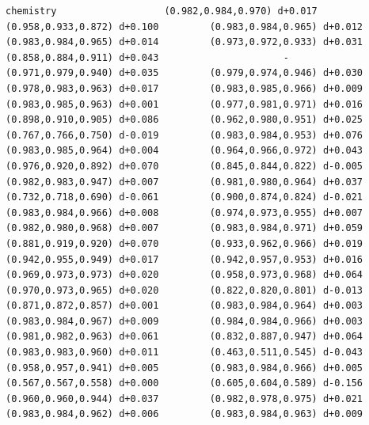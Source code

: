 \documentclass[11pt, letterpaper, openany]{book}
\begin{document}
\begin{empiricalbox}
\begin{lstlisting}[style=terminal]
chemistry                   (0.982,0.984,0.970) d+0.017         (0.958,0.933,0.872) d+0.100         (0.983,0.984,0.965) d+0.012         (0.983,0.984,0.965) d+0.014         (0.973,0.972,0.933) d+0.031         (0.858,0.884,0.911) d+0.043                      -                      (0.971,0.979,0.940) d+0.035         (0.979,0.974,0.946) d+0.030         (0.978,0.983,0.963) d+0.017         (0.983,0.985,0.966) d+0.009         (0.983,0.985,0.963) d+0.001         (0.977,0.981,0.971) d+0.016         (0.898,0.910,0.905) d+0.086         (0.962,0.980,0.951) d+0.025         (0.767,0.766,0.750) d-0.019         (0.983,0.984,0.953) d+0.076         (0.983,0.985,0.964) d+0.004         (0.964,0.966,0.972) d+0.043         (0.976,0.920,0.892) d+0.070         (0.845,0.844,0.822) d-0.005         (0.982,0.983,0.947) d+0.007         (0.981,0.980,0.964) d+0.037         (0.732,0.718,0.690) d-0.061         (0.900,0.874,0.824) d-0.021         (0.983,0.984,0.966) d+0.008         (0.974,0.973,0.955) d+0.007         (0.982,0.980,0.968) d+0.007         (0.983,0.984,0.971) d+0.059         (0.881,0.919,0.920) d+0.070         (0.933,0.962,0.966) d+0.019         (0.942,0.955,0.949) d+0.017         (0.942,0.957,0.953) d+0.016         (0.969,0.973,0.973) d+0.020         (0.958,0.973,0.968) d+0.064         (0.970,0.973,0.965) d+0.020         (0.822,0.820,0.801) d-0.013         (0.871,0.872,0.857) d+0.001         (0.983,0.984,0.964) d+0.003         (0.983,0.984,0.967) d+0.009         (0.984,0.984,0.966) d+0.003         (0.981,0.982,0.963) d+0.061         (0.832,0.887,0.947) d+0.064         (0.983,0.983,0.960) d+0.011         (0.463,0.511,0.545) d-0.043         (0.958,0.957,0.941) d+0.005         (0.983,0.984,0.966) d+0.005         (0.567,0.567,0.558) d+0.000         (0.605,0.604,0.589) d-0.156         (0.960,0.960,0.944) d+0.037         (0.982,0.978,0.975) d+0.021         (0.983,0.984,0.962) d+0.006         (0.983,0.984,0.963) d+0.009     

\end{lstlisting}
\end{empiricalbox}
\end{document}
